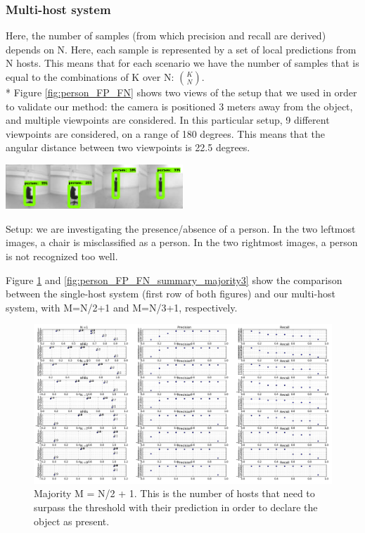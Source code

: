 \documentclass[10pt,conference,compsocconf]{IEEEtran}
\begin{document}
\subsubsection*{Multi-host system}
Here, the number of samples (from which precision and recall are derived) depends on N.
Here, each sample is represented by a set of local predictions from N hosts. This means that for each scenario we have the number of samples that is equal to the combinations of K over N: $\binom{K}{N}$.\\*
Figure \ref{fig:person_FP_FN} shows two views of the setup that we used in order to validate our method: the camera is positioned 3 meters away from the object, and multiple viewpoints are considered. In this particular setup, 9 different viewpoints are considered, on a range of 180 degrees. This means that the angular distance between two viewpoints is 22.5 degrees.
\begin{center}
	\captionsetup{type=figure}
	\includegraphics[width=0.5\textwidth]{img/person_FP_FN.png}
	\caption {Setup: we are investigating the presence/absence of a person. In the two leftmost images, a chair is misclassified as a person. In the two rightmost images, a person is not recognized too well.}
	\label{fig:person_FP_FN}
\end{center}
Figure \ref{fig:person_FP_FN_summary_majority2} and \ref{fig:person_FP_FN_summary_majority3} show the comparison between the single-host system (first row of both figures) and our multi-host system, with M=N/2+1 and M=N/3+1, respectively.
\begin{figure}
	\includegraphics[width=\textwidth]{img/summary_majority_HALF_BIG.png}
	\caption {Majority M = N/2 + 1. This is the number of hosts that need to surpass the threshold with their prediction in order to declare the object as present.}
	\label{fig:person_FP_FN_summary_majority2}
\end{figure}
\end{document}
